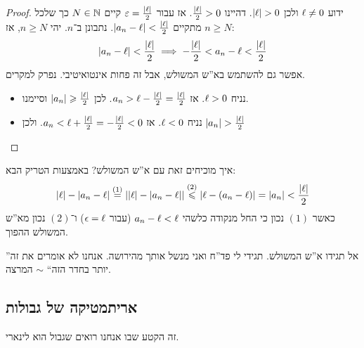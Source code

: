 \documentclass[name=רשימות חשבון דיפרנציאלי ואינטגרלי 1א]{../../../tex/classes/megasumPreamble}
\begin{document}
	\begin{proof}
		ידוע $\ell \neq 0$ ולכן $\left \lvert \ell \right \rvert > 0$. דהיינו $\frac{\left \lvert \ell \right \rvert}{2} > 0$. אז עבור $\eg = \frac{\sof{\ml}}{2}$ קיים $N \in \mathbb{N}$ כך שלכל $n \ge N$ מתקיים $\left \lvert a_n - \ell \right \rvert < \frac{\left \lvert \ell \right \rvert}{2}$. נתבונן ב־$n$. יהי $n \ge N$, אז:
		\[ \left \lvert a_n - \ell \right \rvert < \frac{\left \lvert \ell \right \rvert}{2} \implies -\frac{\left \lvert \ell \right \rvert}{2} < a_n - \ell < \frac{\left \lvert \ell \right \rvert}{2} \]
		אפשר גם להשתמש בא''ש המשולש, אבל זה פחות אינטואיטיבי. נפרק למקרים.
		\begin{itemize}
			\item נניח $\ell > 0$. אז $a_n > \ell - \frac{\left \lvert \ell \right \rvert}{2} = \frac{\left \lvert \ell \right \rvert}{2}$. לכן $\left \lvert a_n \right \rvert \geqslant \frac{\left \lvert \ell \right \rvert}{2}$ וסיימנו.
			\item נניח $\ell < 0$. אז $a_n < \ell + \frac{\left \lvert \ell \right \rvert}{2} = - \frac{\left \lvert \ell \right \rvert}{2} < 0$. ולכן $\left \lvert a_n \right \rvert > \frac{\left \lvert \ell \right \rvert}{2}$
		\end{itemize}
	\end{proof}

איך מוכיחים זאת עם א''ש המשולש? באמצעות הטריק הבא:
	\[ \left \lvert \ell \right \rvert - \left \lvert a_n - \ell \right \rvert \overset{(1)}{=} \left \lvert \left \lvert \ell \right \rvert - \left \lvert a_n - \ell \right \rvert \right \rvert \overset{(2)}{\leqslant} \left \lvert \ell - (a_n - \ell) \right \rvert = \left \lvert a_n \right \rvert < \frac{\left \lvert \ell \right \rvert}{2} \]
	כאשר $(1)$ נכון כי החל מנקודה כלשהי $a_n - \ell < \ell$ (עבור $\epsilon = \ell$) ו־$(2)$ נכון מא''ש המשולש ההפוך.

	''אל תגידו א''ש המשולש. תגידי לי פד''ח ואני מנשל אותך מהירושה. אנחנו לא אומרים את זה יותר בחדר הזה`` $\sim$ המרצה.

	\subsection{אריתמטיקה של גבולות}
	זה הקטע שבו אנחנו רואים שגבול הוא לינארי.

\end{document}
